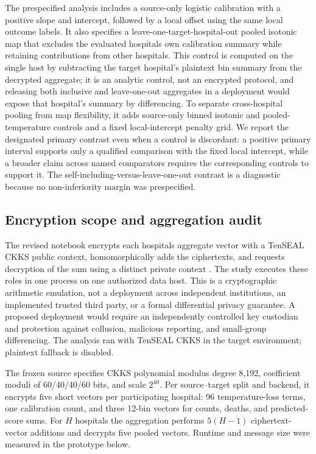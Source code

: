\documentclass[11pt]{article}
\begin{document}
The prespecified analysis includes a source-only logistic calibration with a positive slope and intercept, followed by a local offset using the same local outcome labels. It also specifies a leave-one-target-hospital-out pooled isotonic map that excludes the evaluated hospital\textquotesingle s own calibration summary while retaining contributions from other hospitals. This control is computed on the single host by subtracting the target hospital's plaintext bin summary from the decrypted aggregate; it is an analytic control, not an encrypted protocol, and releasing both inclusive and leave-one-out aggregates in a deployment would expose that hospital's summary by differencing. To separate cross-hospital pooling from map flexibility, it adds source-only binned isotonic and pooled-temperature controls and a fixed local-intercept penalty grid. We report the designated primary contrast even when a control is discordant: a positive primary interval supports only a qualified comparison with the fixed local intercept, while a broader claim across named comparators requires the corresponding controls to support it. The self-including-versus-leave-one-out contrast is a diagnostic because no non-inferiority margin was prespecified.

\subsection*{Encryption scope and aggregation audit}\label{encryption-scope-and-aggregation-audit}

The revised notebook encrypts each hospital\textquotesingle s aggregate vector with a TenSEAL CKKS public context, homomorphically adds the ciphertexts, and requests decryption of the sum using a distinct private context \cite{r7,r18}. The study executes these roles in one process on one authorized data host. This is a cryptographic arithmetic emulation, not a deployment across independent institutions, an implemented trusted third party, or a formal differential privacy guarantee. A proposed deployment would require an independently controlled key custodian and protection against collusion, malicious reporting, and small-group differencing. The analysis ran with TenSEAL CKKS in the target environment; plaintext fallback is disabled.

The frozen source specifies CKKS polynomial modulus degree 8,192, coefficient moduli of 60/40/40/60 bits, and scale $2^{40}$. Per source--target split and backend, it encrypts five short vectors per participating hospital: 96 temperature-loss terms, one calibration count, and three 12-bin vectors for counts, deaths, and predicted-score sums. For $H$ hospitals the aggregation performs $5(H-1)$ ciphertext-vector additions and decrypts five pooled vectors. Runtime and message size were measured in the prototype below.
\end{document}
